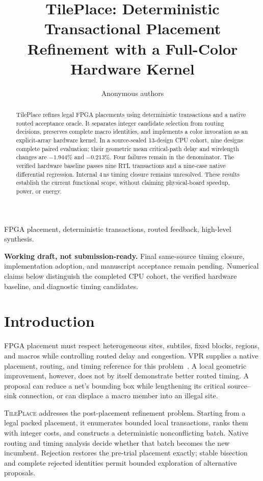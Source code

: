 \documentclass[conference,10pt]{IEEEtran}
\newcommand{\system}{\textsc{TilePlace}}
\begin{document}
\title{TilePlace: Deterministic Transactional Placement Refinement with a Full-Color Hardware Kernel}
\author{Anonymous authors}
\maketitle

\begin{abstract}
TilePlace refines legal FPGA placements using deterministic transactions and
a native routed acceptance oracle. It separates integer candidate selection
from routing decisions, preserves complete macro identities, and implements
a color invocation as an explicit-array hardware kernel. In a source-sealed
13-design CPU cohort, nine designs complete paired evaluation; their geometric
mean critical-path delay and wirelength changes are $-1.944\%$ and $-0.213\%$.
Four failures remain in the denominator. The verified hardware baseline passes
nine RTL transactions and a nine-case native differential regression. Internal
4\,ns timing closure remains unresolved. These results establish the current
functional scope, without claiming physical-board speedup, power, or energy.
\end{abstract}

\begin{IEEEkeywords}
FPGA placement, deterministic transactions, routed feedback, high-level synthesis.
\end{IEEEkeywords}

\noindent\textbf{Working draft, not submission-ready.}
Final same-source timing closure, implementation adoption, and manuscript
acceptance remain pending. Numerical claims below distinguish the completed
CPU cohort, the verified hardware baseline, and diagnostic timing candidates.

\section{Introduction}

FPGA placement must respect heterogeneous sites, subtiles, fixed blocks,
regions, and macros while controlling routed delay and congestion.
VPR supplies a native placement, routing, and timing reference for this
problem~\cite{betz1997vpr,vtr8}. A local geometric improvement, however, does
not by itself demonstrate better routed timing. A proposal can reduce a net's
bounding box while lengthening its critical source--sink connection, or can
displace a macro member into an illegal site.

\system{} addresses the post-placement refinement problem. Starting from a
legal packed placement, it enumerates bounded local transactions, ranks them
with integer costs, and constructs a deterministic nonconflicting batch.
Native routing and timing analysis decide whether that batch becomes the
new incumbent. Rejection restores the pre-trial placement exactly; stable
bisection and complete rejected identities permit bounded exploration of
alternative proposals.
\end{document}
